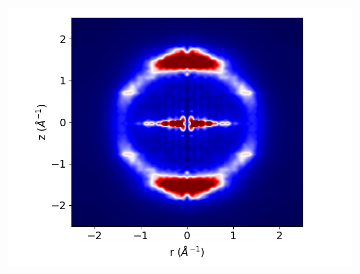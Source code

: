 \documentclass[journal=jpcbfk,manusciprt=article]{achemso}
\begin{document}
\begin{figure}
\begin{subfigure}{0.3\linewidth}
        \caption{}~\label{fig:raw_waxs}
  \end{subfigure}
  \begin{subfigure}{0.3\linewidth}
        \centering
        \includegraphics[width=1.1\linewidth,trim={1cm 0 1.3cm 0},clip]{layered_rzplot.png}
        \caption{}~\label{fig:rz_layered}
  \end{subfigure}
  \begin{subfigure}{0.0544\linewidth}
        \centering
        \vspace{-4.00em}

\end{subfigure}
\end{figure}
\end{document}

